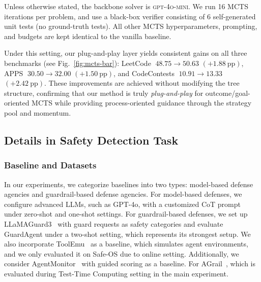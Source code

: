 \documentclass[11pt]{article}
\theoremstyle{definition}
\theoremstyle{remark}
\begin{document}
Unless otherwise stated, the backbone solver is \textsc{gpt-4o-mini}. We run 16 MCTS iterations per problem, and use a black-box verifier consisting of 6 self-generated unit tests (no ground-truth tests). All other MCTS hyperparameters, prompting, and budgets are kept identical to the vanilla baseline.


Under this setting, our plug-and-play layer yields consistent gains on all three benchmarks (see Fig.~\ref{fig:mcts-bar}): LeetCode
\(\;48.75 \rightarrow 50.63\) \((+1.88\ \mathrm{pp})\), APPS
\(\;30.50 \rightarrow 32.00\) \((+1.50\ \mathrm{pp})\), and
CodeContests \(\;10.91 \rightarrow 13.33\)
\((+2.42\ \mathrm{pp})\).
These improvements are achieved without modifying the tree structure, confirming that our method is truly \emph{plug-and-play} for outcome/goal-oriented MCTS while providing process-oriented guidance through the strategy pool and
momentum.

\nolinenumbers
\onecolumn
\subsection{Details in Safety Detection Task}

\subsubsection{Baseline and Datasets}
In our experiments, we categorize baselines into two types: model-based defense agencies and guardrail-based defense agencies. For model-based defenses, we configure advanced LLMs, such as GPT-4o, with a customized CoT prompt~\citep{xiang2025guardagent} under zero-shot and one-shot settings. For guardrail-based defenses, we set up LLaMAGuard3~\citep{inan2023llama} with guard requests as safety categories and evaluate GuardAgent under a two-shot setting, which represents its strongest setup. We also incorporate ToolEmu~\citep{ruan2024identifying}  as a baseline, which simulates agent environments, and we only evaluated it on Safe-OS due to online setting. Additionally, we consider AgentMonitor~\citep{chan2024agentmonitor} with guided scoring as a baseline. For AGrail~\citep{luo-etal-2025-agrail}, which is evaluated during Test-Time Computing setting in the main experiment.
\end{document}
